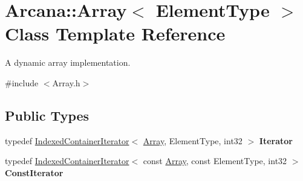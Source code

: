 \hypertarget{class_arcana_1_1_array}{}\section{Arcana\+:\+:Array$<$ Element\+Type $>$ Class Template Reference}
\label{class_arcana_1_1_array}


A dynamic array implementation.  




{\ttfamily \#include $<$Array.\+h$>$}

\subsection*{Public Types}
\begin{DoxyCompactItemize}
\item 
\mbox{\label{class_arcana_1_1_array_a86a41fae7e14a94fd085bfffcc40e3b1}} 
typedef \mbox{\hyperlink{class_arcana_1_1_indexed_container_iterator}{Indexed\+Container\+Iterator}}$<$ \mbox{\hyperlink{class_arcana_1_1_array}{Array}}, Element\+Type, int32 $>$ {\bfseries Iterator}
\item 
\mbox{\label{class_arcana_1_1_array_ad04b27e3627e03c3771db375bd68bae7}} 
typedef \mbox{\hyperlink{class_arcana_1_1_indexed_container_iterator}{Indexed\+Container\+Iterator}}$<$ const \mbox{\hyperlink{class_arcana_1_1_array}{Array}}, const Element\+Type, int32 $>$ {\bfseries Const\+Iterator}
\end{DoxyCompactItemize}
